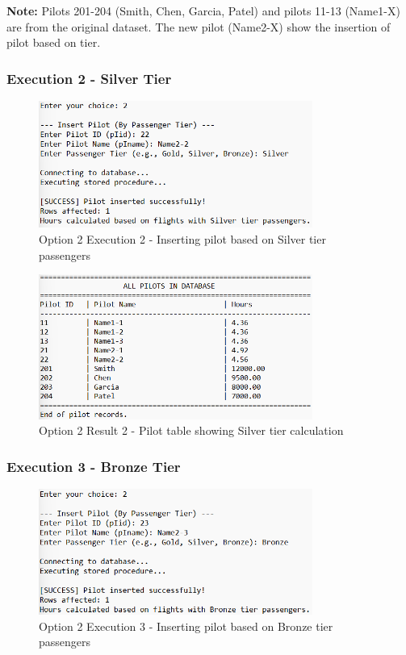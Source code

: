 \documentclass[12pt]{article}
\begin{document}
\textbf{Note:} Pilots 201-204 (Smith, Chen, Garcia, Patel) and pilots 11-13 (Name1-X) are from the original dataset. The new pilot (Name2-X) show the insertion of pilot based on tier.


\newpage
\subsubsection{Execution 2 - Silver Tier}

\begin{figure}[h]
\centering
\includegraphics[width=0.8\textwidth]{../../../Screenshots/Problem1/Option2/Option2-2.png}
\caption{Option 2 Execution 2 - Inserting pilot based on Silver tier passengers}
\label{fig:option2_exec2}
\end{figure}

\begin{figure}[h]
\centering
\includegraphics[width=0.8\textwidth]{../../../Screenshots/Problem1/Option2/Option2-2_result.png}
\caption{Option 2 Result 2 - Pilot table showing Silver tier calculation}
\label{fig:option2_result2}
\end{figure}

\newpage
\subsubsection{Execution 3 - Bronze Tier}

\begin{figure}[h]
\centering
\includegraphics[width=0.8\textwidth]{../../../Screenshots/Problem1/Option2/Option2-3.png}
\caption{Option 2 Execution 3 - Inserting pilot based on Bronze tier passengers}
\label{fig:option2_exec3}
\end{figure}
\end{document}
